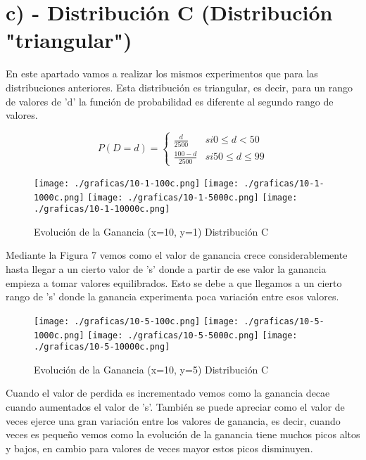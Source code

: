 \documentclass{article}
\begin{document}
\newpage



\section*{c) - Distribución C (Distribución "triangular")}	
	En este apartado vamos a realizar los mismos experimentos que para las distribuciones anteriores. Esta distribución es triangular, es decir, para un rango de valores de 'd' la función de probabilidad es diferente al segundo rango de valores. 
	
		$$
		P(D=d)=\left\{\begin{array}{ll}{\frac{d}{2500}} & { { si } 0 \leq d<50} \\ {\frac{100-d}{2500}} & { { si } 50 \leq d \leq 99}\end{array}\right.
		$$
	
	\begin{figure}[h]
		\centering
		\texttt{[image: ./graficas/10-1-100c.png]}
		\texttt{[image: ./graficas/10-1-1000c.png]}
		\texttt{[image: ./graficas/10-1-5000c.png]}
		\texttt{[image: ./graficas/10-1-10000c.png]}
		\caption{Evolución de la Ganancia (x=10, y=1) Distribución C}
	\end{figure} 


	Mediante la Figura 7 vemos como el valor de ganancia crece considerablemente hasta llegar a un cierto valor de 's' donde a partir de ese valor la ganancia empieza a tomar valores equilibrados. Esto se debe a que llegamos a un cierto rango de 's' donde la ganancia experimenta poca variación entre esos valores.
	
	\begin{figure}[h]
		\centering
		\texttt{[image: ./graficas/10-5-100c.png]}
		\texttt{[image: ./graficas/10-5-1000c.png]}
		\texttt{[image: ./graficas/10-5-5000c.png]}
		\texttt{[image: ./graficas/10-5-10000c.png]}
		\caption{Evolución de la Ganancia (x=10, y=5) Distribución C}
	\end{figure} 
	\newpage
	
	Cuando el valor de perdida es incrementado vemos como la ganancia decae cuando aumentados el valor de 's'. También se puede apreciar como el valor de veces ejerce una gran variación entre los valores de ganancia, es decir, cuando veces es pequeño vemos como la evolución de la ganancia tiene muchos picos altos y bajos, en cambio para valores de veces mayor estos picos disminuyen.
	
\end{document}
